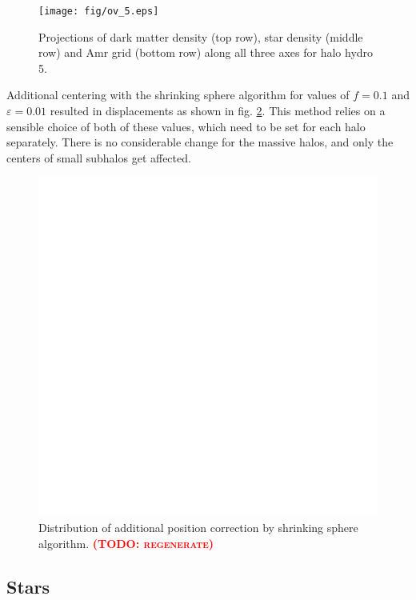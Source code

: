 \documentclass[useAMS,usenatbib]{mn2e}
\newcommand{\TODO}[1]{\textsc{\textbf{\textcolor{red}{(TODO: #1)}}}}
\begin{document}
\begin{figure}
  \begin{center}
    \texttt{[image: fig/ov\_5.eps]}
  \end{center}
  \caption{\label{fig:ov_4}Projections of dark matter density (top
    row), star density (middle row) and {\sc Amr} grid (bottom row)
    along all three axes for halo {\sc hydro 5}.}
\end{figure}

Additional centering with the shrinking sphere algorithm for values of
$f=0.1$ and $\varepsilon=0.01$ resulted in displacements as shown in
fig. \ref{fig:hist_shrsph}. This method relies on a sensible choice of
both of these values, which need to be set for each halo
separately. There is no considerable change for the massive halos, and
only the centers of small subhalos get affected.

\begin{figure}
  \begin{center}
    \includegraphics[width=\textwidth]{fig/a.eps}%
  \end{center}
  \caption{\label{fig:hist_shrsph}Distribution of additional position
    correction by shrinking sphere algorithm. \TODO{regenerate}}
\end{figure}

\subsection{Stars}
\end{document}
